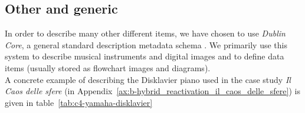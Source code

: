 \begin{longtable}{|p{}|p{}|p{}|}
\end{longtable}

\subsection{Other and generic}
In order to describe many other different items, we have chosen to use \textit{Dublin Core}, a general standard description metadata schema \cite{DublinCore}. We primarily use this system to describe musical instruments and digital images and to define data items (usually stored as flowchart images and diagrams).\\
A concrete example of describing the Disklavier piano used in the case study \textit{Il Caos delle sfere} (in Appendix~\ref{ax:b-hybrid_reactivation_il_caos_delle_sfere}) is given in table~\ref{tab:c4-yamaha-disklavier}

